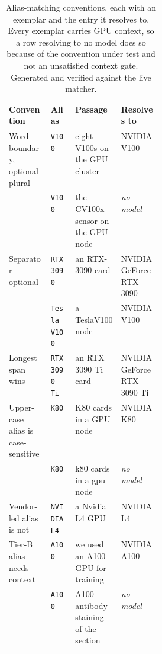\begin{table}[t]
\centering\small
\caption{Alias-matching conventions, each with an exemplar and the entry it resolves to. Every exemplar carries GPU context, so a row resolving to no model does so because of the convention under test and not an unsatisfied context gate. Generated and verified against the live matcher.}
\label{tab:matching-conventions}
\begin{tabular}{l l p{0.30\linewidth} l}
\hline
Convention & Alias & Passage & Resolves to \\
\hline
Word boundary, optional plural & \texttt{V100} & eight V100s on the GPU cluster & NVIDIA V100 \\
 & \texttt{V100} & the CV100x sensor on the GPU node & \emph{no model} \\
Separator optional & \texttt{RTX 3090} & an RTX-3090 card & NVIDIA GeForce RTX 3090 \\
 & \texttt{Tesla V100} & a TeslaV100 node & NVIDIA V100 \\
Longest span wins & \texttt{RTX 3090 Ti} & an RTX 3090 Ti card & NVIDIA GeForce RTX 3090 Ti \\
Upper-case alias is case-sensitive & \texttt{K80} & K80 cards in a GPU node & NVIDIA K80 \\
 & \texttt{K80} & k80 cards in a gpu node & \emph{no model} \\
Vendor-led alias is not & \texttt{NVIDIA L4} & a Nvidia L4 GPU & NVIDIA L4 \\
Tier-B alias needs context & \texttt{A100} & we used an A100 GPU for training & NVIDIA A100 \\
 & \texttt{A100} & A100 antibody staining of the section & \emph{no model} \\
\hline
\end{tabular}
\end{table}
